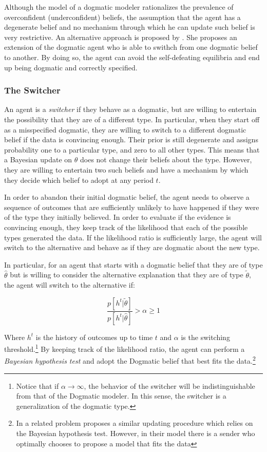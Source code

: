 \documentclass[
  12pt,
]{article}
\begin{document}
Although the model of a dogmatic modeler rationalizes the prevalence of
overconfident (underconfident) beliefs, the assumption that the agent
has a degenerate belief and no mechanism through which he can update
such belief is very restrictive. An alternative approach is proposed by
\citet{Ba2023}. She proposes an extension of the dogmatic agent who is
able to swithch from one dogmatic belief to another. By doing so, the
agent can avoid the self-defeating equilibria and end up being dogmatic
and correctly specified.

\hypertarget{the-switcher}{%
\subsubsection{The Switcher}\label{the-switcher}}

An agent is a \emph{switcher} if they behave as a dogmatic, but are
willing to entertain the possibility that they are of a different type.
In particular, when they start off as a misspecified dogmatic, they are
willing to switch to a different dogmatic belief if the data is
convincing enough. Their prior is still degenerate and assigns
probability one to a particular type, and zero to all other types. This
means that a Bayesian update on \(\theta\) does not change their beliefs
about the type. However, they are willing to entertain two such beliefs
and have a mechanism by which they decide which belief to adopt at any
period \(t\).

In order to abandon their initial dogmatic belief, the agent needs to
observe a sequence of outcomes that are sufficiently unlikely to have
happened if they were of the type they initially believed. In order to
evaluate if the evidence is convincing enough, they keep track of the
likelihood that each of the possible types generated the data. If the
likelihood ratio is sufficiently large, the agent will switch to the
alternative and behave as if they are dogmatic about the new type.

In particular, for an agent that starts with a dogmatic belief that they
are of type \(\hat{\theta}\) but is willing to consider the alternative
explanation that they are of type \(\tilde{\theta}\), the agent will
switch to the alternative if:

\[\frac{p[h^t|\tilde{\theta}]}{p[h^t|\hat{\theta}]} > \alpha\geq 1\]

Where \(h^t\) is the history of outcomes up to time \(t\) and \(\alpha\)
is the switching
threshold.\footnote{Notice that if $\alpha \to \infty$, the behavior of the switcher will be indistinguishable from that of the Dogmatic modeler. 
In this sense, the switcher is a generalization of the dogmatic type.}
By keeping track of the likelihood ratio, the agent can perform a
\emph{Bayesian hypothesis test} and adopt the Dogmatic belief that best
fits the
data.\footnote{In a related problem \citet{Schwarstein2021} proposes a similar updating procedure which relies on the Bayesian 
hypothesis test. However, in their model there is a sender who optimally chooses to propose a model that fits the data}
\end{document}
